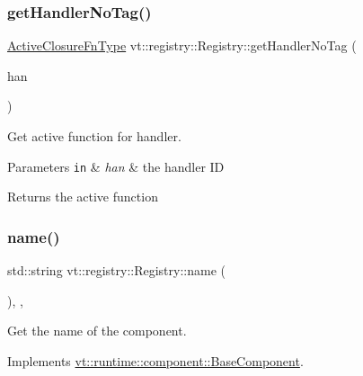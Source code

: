\subsubsection{\texorpdfstring{get\+Handler\+No\+Tag()}{getHandlerNoTag()}}
{\footnotesize\ttfamily \hyperlink{namespacevt_a2a06c34cafcd511828f16cbf1476b924}{Active\+Closure\+Fn\+Type} vt\+::registry\+::\+Registry\+::get\+Handler\+No\+Tag (\begin{DoxyParamCaption}\item[{\hyperlink{namespacevt_af64846b57dfcaf104da3ef6967917573}{Handler\+Type} const \&}]{han }\end{DoxyParamCaption})}



Get active function for handler. 


\begin{DoxyParams}[1]{Parameters}
\mbox{\tt in}  & {\em han} & the handler ID\\
\hline
\end{DoxyParams}
\begin{DoxyReturn}{Returns}
the active function 
\end{DoxyReturn}
\mbox{\label{structvt_1_1registry_1_1_registry_a8488eb3ab95e207094617027bb5c75c9}} 
\subsubsection{\texorpdfstring{name()}{name()}}
{\footnotesize\ttfamily std\+::string vt\+::registry\+::\+Registry\+::name (\begin{DoxyParamCaption}{ }\end{DoxyParamCaption})\hspace{0.3cm}{\ttfamily [inline]}, {\ttfamily [override]}, {\ttfamily [virtual]}}



Get the name of the component. 



Implements \hyperlink{structvt_1_1runtime_1_1component_1_1_base_component_a7701485f3539f78d42e6bad47fc7eb78}{vt\+::runtime\+::component\+::\+Base\+Component}.

\mbox{\label{structvt_1_1registry_1_1_registry_ad4fdbf2cfbe4e852c5556435efe4255f}} 
